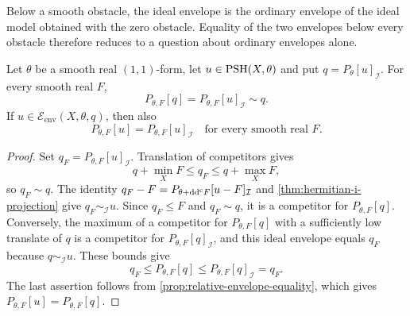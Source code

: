 Below a smooth obstacle, the ideal envelope is the ordinary envelope of the ideal model obtained with the zero obstacle. Equality of the two envelopes below every obstacle therefore reduces to a question about ordinary envelopes alone.

\begin{proposition}\label{prop:ideal-obstacle-reprojection}
Let $\theta$ be a smooth real $(1,1)$-form, let $u\in\mathrm{PSH}(X,\theta)$ and put $q=P_\theta[u]_{\mathcal I}$. For every smooth real $F$,
\[
 P_{\theta,F}[q]=P_{\theta,F}[u]_{\mathcal I}\sim q.
\]
If $u\in\mathcal E_{\mathrm{env}}(X,\theta,q)$, then also
\[
 P_{\theta,F}[u]=P_{\theta,F}[u]_{\mathcal I}
 \quad\text{for every smooth real }F.
\]
\end{proposition}
\begin{proof}
Set $q_F=P_{\theta,F}[u]_{\mathcal I}$. Translation of competitors gives
\[
 q+\min_XF\leq q_F\leq q+\max_XF,
\]
so $q_F\sim q$. The identity
$q_F-F=P_{\theta+\mathrm{dd}^{\mathrm{c}} F}[u-F]_{\mathcal I}$ and \cref{thm:hermitian-i-projection} give $q_F\sim_{\mathcal I}u$. Since $q_F\leq F$ and $q_F\sim q$, it is a competitor for $P_{\theta,F}[q]$. Conversely, the maximum of a competitor for $P_{\theta,F}[q]$ with a sufficiently low translate of $q$ is a competitor for $P_{\theta,F}[q]_{\mathcal I}$, and this ideal envelope equals $q_F$ because $q\sim_{\mathcal I}u$. These bounds give
\[
 q_F\leq P_{\theta,F}[q]\leq P_{\theta,F}[q]_{\mathcal I}=q_F.
\]
The last assertion follows from \cref{prop:relative-envelope-equality}, which gives $P_{\theta,F}[u]=P_{\theta,F}[q]$.
\end{proof}

